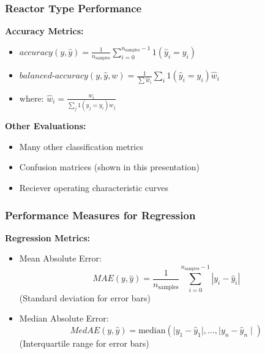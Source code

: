 \begin{frame}
  \frametitle{Reactor Type Performance}
  \textbf{Accuracy Metrics:} \cite{scikit}
  \begin{itemize}
    \item $\textit{accuracy}(y, \hat{y}) = \frac{1}{n_\text{samples}} \sum_{i=0}^{n_\text{samples}-1} 1(\hat{y}_i = y_i)$
    \item $\textit{balanced-accuracy}(y, \hat{y}, w) = \frac{1}{\sum{\hat{w}_i}} \sum_i 1(\hat{y}_i = y_i) \hat{w}_i$
    \item $\text{where: } \hat{w}_i = \frac{w_i}{\sum_j{1(y_j = y_i) w_j}}$
  \end{itemize}
  \textbf{Other Evaluations:}
  \begin{itemize}
    \item Many other classification metrics 
    \item Confusion matrices (shown in this presentation)
    \item Reciever operating characteristic curves
  \end{itemize}
\end{frame}

\begin{frame}
  \frametitle{Performance Measures for Regression}
  \textbf{Regression Metrics:} \cite{scikit}
  \begin{itemize}
    \item Mean Absolute Error:
          $$\textit{MAE}(y, \hat{y}) = \frac{1}{n_{\text{samples}}} \sum_{i=0}^{n_{\text{samples}}-1} \left| y_i - \hat{y}_i \right|$$
          (Standard deviation for error bars)
    \item Median Absolute Error:
          $$\textit{MedAE}(y, \hat{y}) = \text{median}(\mid y_1 - \hat{y}_1 \mid, \ldots, \mid y_n - \hat{y}_n \mid)$$
          (Interquartile range for error bars)
  \end{itemize}
\end{frame}

